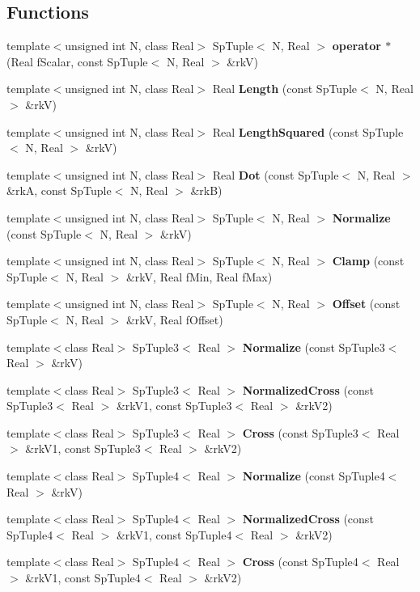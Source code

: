 \subsection*{Functions}
\begin{CompactItemize}
\item 
template$<$unsigned int N, class Real$>$ Sp\-Tuple$<$ N, Real $>$ {\bf operator $\ast$} (Real f\-Scalar, const Sp\-Tuple$<$ N, Real $>$ \&rk\-V)
\item 
template$<$unsigned int N, class Real$>$ Real {\bf Length} (const Sp\-Tuple$<$ N, Real $>$ \&rk\-V)
\item 
template$<$unsigned int N, class Real$>$ Real {\bf Length\-Squared} (const Sp\-Tuple$<$ N, Real $>$ \&rk\-V)
\item 
template$<$unsigned int N, class Real$>$ Real {\bf Dot} (const Sp\-Tuple$<$ N, Real $>$ \&rk\-A, const Sp\-Tuple$<$ N, Real $>$ \&rk\-B)
\item 
template$<$unsigned int N, class Real$>$ Sp\-Tuple$<$ N, Real $>$ {\bf Normalize} (const Sp\-Tuple$<$ N, Real $>$ \&rk\-V)
\item 
template$<$unsigned int N, class Real$>$ Sp\-Tuple$<$ N, Real $>$ {\bf Clamp} (const Sp\-Tuple$<$ N, Real $>$ \&rk\-V, Real f\-Min, Real f\-Max)
\item 
template$<$unsigned int N, class Real$>$ Sp\-Tuple$<$ N, Real $>$ {\bf Offset} (const Sp\-Tuple$<$ N, Real $>$ \&rk\-V, Real f\-Offset)
\item 
template$<$class Real$>$ Sp\-Tuple3$<$ Real $>$ {\bf Normalize} (const Sp\-Tuple3$<$ Real $>$ \&rk\-V)
\item 
template$<$class Real$>$ Sp\-Tuple3$<$ Real $>$ {\bf Normalized\-Cross} (const Sp\-Tuple3$<$ Real $>$ \&rk\-V1, const Sp\-Tuple3$<$ Real $>$ \&rk\-V2)
\item 
template$<$class Real$>$ Sp\-Tuple3$<$ Real $>$ {\bf Cross} (const Sp\-Tuple3$<$ Real $>$ \&rk\-V1, const Sp\-Tuple3$<$ Real $>$ \&rk\-V2)
\item 
template$<$class Real$>$ Sp\-Tuple4$<$ Real $>$ {\bf Normalize} (const Sp\-Tuple4$<$ Real $>$ \&rk\-V)
\item 
template$<$class Real$>$ Sp\-Tuple4$<$ Real $>$ {\bf Normalized\-Cross} (const Sp\-Tuple4$<$ Real $>$ \&rk\-V1, const Sp\-Tuple4$<$ Real $>$ \&rk\-V2)
\item 
template$<$class Real$>$ Sp\-Tuple4$<$ Real $>$ {\bf Cross} (const Sp\-Tuple4$<$ Real $>$ \&rk\-V1, const Sp\-Tuple4$<$ Real $>$ \&rk\-V2)
\end{CompactItemize}


